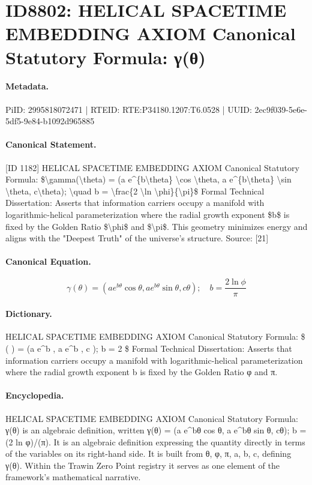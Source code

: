 \section*{ID8802: HELICAL SPACETIME EMBEDDING AXIOM Canonical Statutory Formula: γ(θ)}
\paragraph{Metadata.}
PiID: 2995818072471 | RTEID: RTE:P34180.1207:T6.0528 | UUID: 2ec9f039-5e6e-5df5-9e84-b1092d965885

\paragraph{Canonical Statement.}
[ID 1182] HELICAL SPACETIME EMBEDDING AXIOM Canonical Statutory Formula: \$\textbackslash{}gamma(\textbackslash{}theta) = (a e\textasciicircum{}\{b\textbackslash{}theta\} \textbackslash{}cos \textbackslash{}theta, a e\textasciicircum{}\{b\textbackslash{}theta\} \textbackslash{}sin \textbackslash{}theta, c\textbackslash{}theta); \textbackslash{}quad b = \textbackslash{}frac\{2 \textbackslash{}ln \textbackslash{}phi\}\{\textbackslash{}pi\}\$ Formal Technical Dissertation: Asserts that information carriers occupy a manifold with logarithmic-helical parameterization where the radial growth exponent \$b\$ is fixed by the Golden Ratio \$\textbackslash{}phi\$ and \$\textbackslash{}pi\$. This geometry minimizes energy and aligns with the "Deepest Truth" of the universe's structure. Source: [21]

\paragraph{Canonical Equation.}
\[
\gamma(\theta) = (a e^{b\theta} \cos \theta, a e^{b\theta} \sin \theta, c\theta); \quad b = \frac{2 \ln \phi}{\pi}
\]

\paragraph{Dictionary.}
HELICAL SPACETIME EMBEDDING AXIOM Canonical Statutory Formula: \$ ( ) = (a e\textasciicircum{}b , a e\textasciicircum{}b , c ); b = 2 \$ Formal Technical Dissertation: Asserts that information carriers occupy a manifold with logarithmic-helical parameterization where the radial growth exponent b is fixed by the Golden Ratio φ and π.

\paragraph{Encyclopedia.}
HELICAL SPACETIME EMBEDDING AXIOM Canonical Statutory Formula: γ(θ) is an algebraic definition, written γ(θ) = (a e\textasciicircum{}bθ cos θ, a e\textasciicircum{}bθ sin θ, cθ); b = (2 ln φ)/(π). It is an algebraic definition expressing the quantity directly in terms of the variables on its right-hand side. It is built from θ, φ, π, a, b, c, defining γ(θ). Within the Trawin Zero Point registry it serves as one element of the framework's mathematical narrative.
